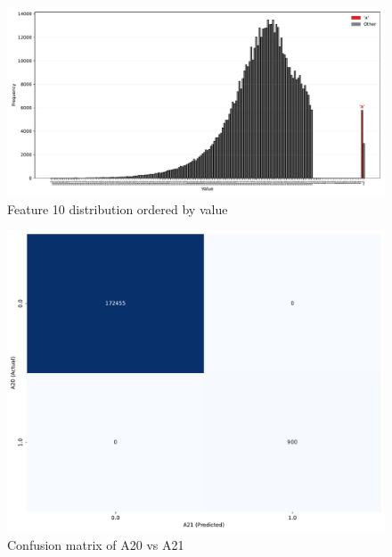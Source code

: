\documentclass[11pt]{article}
\begin{document}
\begin{figure}
		\begin{minipage}[t]{\textwidth}
		\centering
		\includegraphics[width=\textwidth]{images/10_distribution.pdf}
		\caption{Feature 10 distribution ordered by value}
		\label{fig:f10}
	\end{minipage}
\end{figure}

\begin{figure}
	\begin{minipage}[t]{\textwidth}
		\centering
		\includegraphics[width=\textwidth]{images/confusion_matrix_A20_A21.pdf}
		\caption{Confusion matrix of A20 vs A21}
		\label{fig:a20a21}
	\end{minipage}
\end{figure}


%
%
\end{document}
